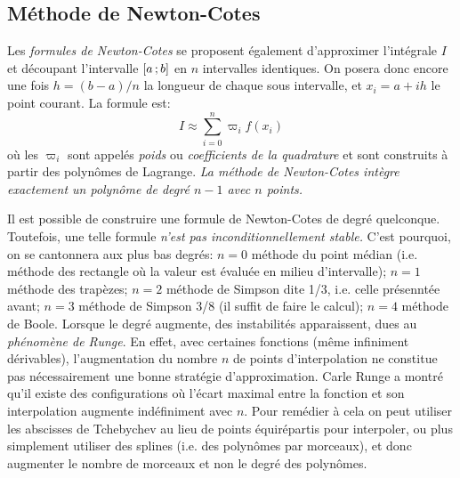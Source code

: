\subsection*{Méthode de Newton-Cotes} 
Les \emph{formules de Newton-Cotes} se proposent également d'approximer l'intégrale $I$ et découpant l'intervalle $\mathopen{[}a\,;b\mathclose{]}$ en $n$ intervalles identiques. On posera donc encore une fois $h=(b-a)/n$ la longueur de chaque sous intervalle, et $x_i=a+ih$ le point courant. La formule est: 
\begin{equation}
 I\approx \sum_{i=0}^n \varpi_i f(x_i) 
\end{equation}
où les $\varpi_i$ sont appelés \emph{poids} ou \emph{coefficients de la quadrature} et sont construits à partir des polynômes de Lagrange. \emph{La méthode de Newton-Cotes intègre exactement un polynôme de degré $n-1$ avec $n$ points.} 

\begin{remarque} Il est possible de construire une formule de Newton-Cotes de degré quelconque. Toutefois, une telle formule \emph{n'est pas inconditionnellement stable.} C'est pourquoi, on se cantonnera aux plus bas degrés: $n=0$ méthode du point médian (i.e. méthode des rectangle où la valeur est évaluée en milieu d'intervalle); $n=1$ méthode des trapèzes; $n=2$ méthode de Simpson dite 1/3, i.e. celle présenntée avant; $n=3$ méthode de Simpson 3/8 (il suffit de faire le calcul); $n=4$ méthode de Boole. Lorsque le degré augmente, des instabilités apparaissent, dues au \emph{phénomène de Runge}. En effet, avec certaines fonctions (même infiniment dérivables), l'augmentation du nombre $n$ de points d'interpolation ne constitue pas nécessairement une bonne stratégie d'approximation. Carle Runge a montré qu'il existe des configurations où l'écart maximal entre la fonction et son interpolation augmente indéfiniment avec $n$. Pour remédier à cela on peut utiliser les abscisses de Tchebychev au lieu de points équirépartis pour interpoler, ou plus simplement utiliser des splines (i.e. des polynômes par morceaux), et donc augmenter le nombre de morceaux et non le degré des polynômes. 
\end{remarque} 

